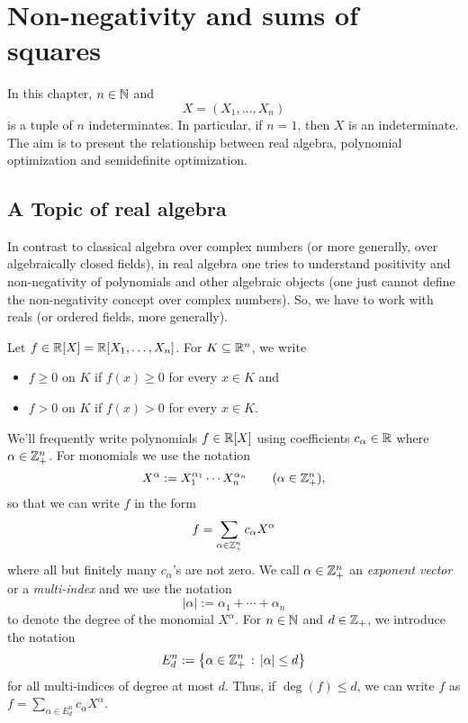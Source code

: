 \section{Non-negativity and sums of squares} 

In this chapter, $n \in \mathbb{N}$ and  
\[
X=(X_1,\ldots,X_n)
\]
is a tuple of $n$ indeterminates. In particular, if $n=1$, then $X$ is an indeterminate. The aim is to present the relationship between real algebra, polynomial optimization and semidefinite optimization. 

\subsection{A Topic of real algebra}

In contrast to classical algebra over complex numbers (or more generally, over algebraically closed fields), in real algebra one tries to understand positivity and non-negativity of polynomials and other algebraic objects (one just cannot define the non-negativity concept over complex numbers). So, we have to work with reals (or ordered fields, more generally). 

Let $f \in \mathbb{R}[X]=\mathbb{R}[X_1,\ldots,X_n]$. For $K \subseteq \mathbb{R}^n$, we write 
\begin{itemize}
	\item $f \ge 0$ on $K$ if $f(x) \ge 0$ for every $x \in K$ and 
	\item $f > 0$ on $K$ if $f(x)> 0$ for every $x \in K$.
\end{itemize}


We'll frequently write polynomials $f \in \mathbb{R}[X]$ using coefficients $c_\alpha \in \mathbb{R}$ where $\alpha \in \mathbb{Z}_+^n$. For monomials we use the notation
\[
	X^\alpha := X_1^{\alpha_1} \cdots X_n^{\alpha_n}  \qquad (\alpha \in \mathbb{Z}_+^n),
\]
so that we can write $f$ in the form 
\[
	f = \sum_{\alpha \in \mathbb{Z}_+^n} c_\alpha X^\alpha
\] 
where all but finitely many $c_\alpha$'s are not zero. 
We call $\alpha \in \mathbb{Z}_+^n$ an \emph{exponent vector} or a \emph{multi-index} and we use the notation
\[
	|\alpha| := \alpha_1 + \cdots + \alpha_n
\]
to denote the degree of the monomial $X^\alpha$. For $n \in \mathbb{N}$ and $d \in \mathbb{Z}_+$, we introduce the notation 
\[
	E^n_d := \left\{ \alpha \in \mathbb{Z}_+^n \,:\, |\alpha| \le d \right\}
\]
for all multi-indices of degree at most $d$. Thus, if $\deg(f) \le d$, we can write $f$ as $f = \sum_{\alpha \in E^n_d} c_\alpha X^\alpha$. 

